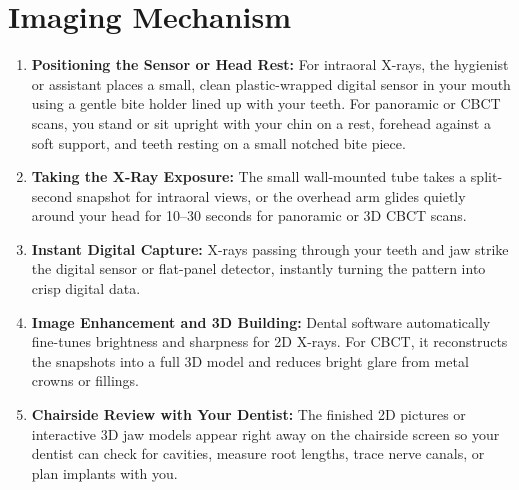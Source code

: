 \section{Imaging Mechanism}
\begin{enumerate}
\item \textbf{Positioning the Sensor or Head Rest:} For intraoral X-rays, the hygienist or assistant places a small, clean plastic-wrapped digital sensor in your mouth using a gentle bite holder lined up with your teeth. For panoramic or CBCT scans, you stand or sit upright with your chin on a rest, forehead against a soft support, and teeth resting on a small notched bite piece.
\item \textbf{Taking the X-Ray Exposure:} The small wall-mounted tube takes a split-second snapshot for intraoral views, or the overhead arm glides quietly around your head for 10--30 seconds for panoramic or 3D CBCT scans.
\item \textbf{Instant Digital Capture:} X-rays passing through your teeth and jaw strike the digital sensor or flat-panel detector, instantly turning the pattern into crisp digital data.
\item \textbf{Image Enhancement and 3D Building:} Dental software automatically fine-tunes brightness and sharpness for 2D X-rays. For CBCT, it reconstructs the snapshots into a full 3D model and reduces bright glare from metal crowns or fillings.
\item \textbf{Chairside Review with Your Dentist:} The finished 2D pictures or interactive 3D jaw models appear right away on the chairside screen so your dentist can check for cavities, measure root lengths, trace nerve canals, or plan implants with you.
\end{enumerate}

